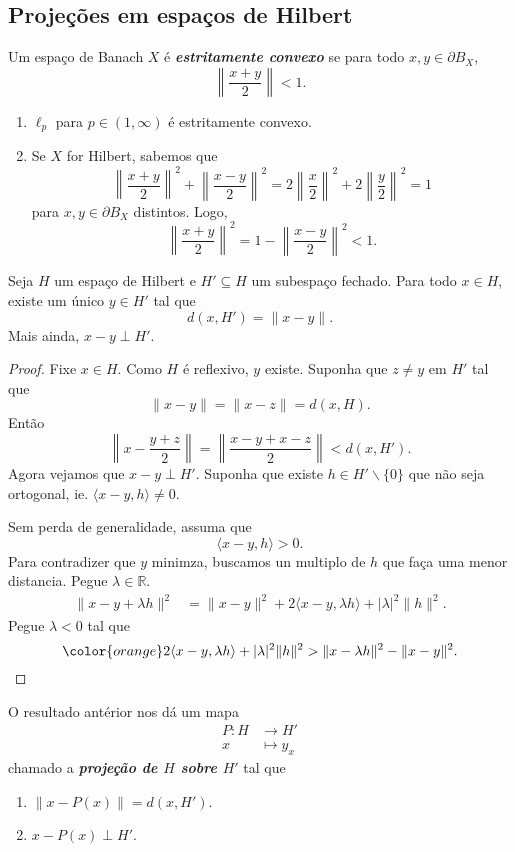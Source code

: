 \documentclass[portuguese]{article}
\theoremstyle{definition}
\newcommand{\R}{\mathbb{R}}
\begin{document}
\subsection{Projeções em espaços de Hilbert}
\begin{defn}
	Um espaço de Banach $X$ é \textbf{\textit{estritamente convexo}} se para todo $x,y\in\partial B_X$,
	\[\left\|\frac{x+y}{2}\right\|<1.\]
\end{defn}
\begin{exemplos}\leavevmode
	\begin{enumerate}
		\item $\ell_p$ para $p\in(1,\infty)$ é estritamente convexo.
		\item Se $X$ for Hilbert, sabemos que
		\[\left\|\frac{x+y}{2}\right\|^2+\left\|\frac{x-y}{2}\right\|^2=2\left\|\frac{x}{2}\right\|^2+2\left\|\frac{y}{2}\right\|^2=1\]
		para $x,y\in\partial B_X$ distintos. Logo,
		\[\left\|\frac{x+y}{2}\right\|^2=1-\left\|\frac{x-y}{2}\right\|^2<1.\]
	\end{enumerate}
\end{exemplos}
\begin{prop}
	Seja $H$ um espaço de Hilbert e $H'\subseteq H$ um subespaço fechado. Para todo $x\in H$, existe um único $y\in H'$ tal que
	\[d(x,H')=\|x-y\|.\]
	Mais ainda, $x-y\perp H'$.
\end{prop}
\begin{proof}
	Fixe $x\in H$. Como $H$ é reflexivo, $y$ existe. Suponha que $z\neq y$ em $H'$ tal que
	\[\|x-y\|=\|x-z\|=d(x,H).\]
	Então
	\[\left\|x-\frac{y+z}{2}\right\|=\left\|\frac{x-y+x-z}{2}\right\|<d(x,H').\]
	Agora vejamos que $x-y\perp H'$. Suponha que existe $h\in H'\backslash\{0\}$ que não seja ortogonal, ie. $\langle x-y,h\rangle\neq0$.
	
	Sem perda de generalidade, assuma que
	\[\langle x-y,h\rangle>0.\]
	Para contradizer que $y$ minimza, buscamos un multiplo de $h$ que faça uma menor distancia. Pegue $\lambda\in\R$.
	\begin{align*}
		\|x-y+\lambda h\|^2&=\|x -y\|^2+2\langle x-y,\lambda h\rangle+|\lambda|^2\|h\|^2.
	\end{align*}
	Pegue $\lambda<0$ tal que
	\[{\color{orange}2\langle x-y,\lambda h\rangle+|\lambda|^2\|h\|^2>\|x-\lambda h\|^2-\|x-y\|^2}.\]
\end{proof}
\begin{defn}
	O resultado antérior nos dá um mapa
	\begin{align*}
		P:H&\to H'\\
	x&\mapsto y_x
	\end{align*}
	chamado a \textbf{\textit{projeção de $H$ sobre $H'$}}
	tal que
	\begin{enumerate}
		\item $\|x-P(x)\|=d(x,H')$.
		\item $x-P(x)\perp H'$.
	\end{enumerate}
\end{defn}
\end{document}
